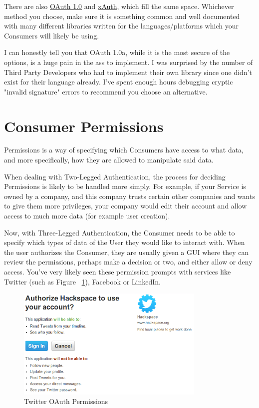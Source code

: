 \documentclass{book}
\begin{document}
There are also \href{http://tools.ietf.org/html/rfc5849}{OAuth 1.0} and \href{https://dev.twitter.com/docs/oauth/xauth}{xAuth}, which fill the same space. Whichever method you choose, make sure it is something common and well documented with many different libraries written for the languages/platforms which your Consumers will likely be using.

I can honestly tell you that OAuth 1.0a, while it is the most secure of the options, is a huge pain in the ass to implement. I was surprised by the number of Third Party Developers who had to implement their own library since one didn't exist for their language already. I've spent enough hours debugging cryptic "invalid signature" errors to recommend you choose an alternative.


\section{Consumer Permissions}

Permissions is a way of specifying which Consumers have access to what data, and more specifically, how they are allowed to manipulate said data.

When dealing with Two-Legged Authentication, the process for deciding Permissions is likely to be handled more simply. For example, if your Service is owned by a company, and this company trusts certain other companies and wants to give them more privileges, your company would edit their account and allow access to much more data (for example user creation).

Now, with Three-Legged Authentication, the Consumer needs to be able to specify which types of data of the User they would like to interact with. When the user authorizes the Consumer, they are usually given a GUI where they can review the permissions, perhaps make a decision or two, and either allow or deny access. You've very likely seen these permission prompts with services like Twitter (such as Figure ~\ref{fig:twitteroauth}), Facebook or LinkedIn.

\begin{figure}[ht!]
\centering
\includegraphics[width=90mm]{images/permissions-twitter.png}
\caption{Twitter OAuth Permissions}
\label{fig:twitteroauth}
\end{figure}
\end{document}
